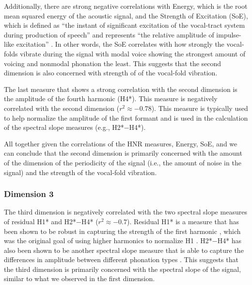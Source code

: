 Additionally, there are strong negative correlations with Energy, which is the root mean squared energy of the acoustic signal, and the Strength of Excitation (SoE), which is defined as ``the instant of significant excitation of the vocal-tract system during production of speech'' and represents ``the relative amplitude of impulse-like excitation'' \citep[1934]{mittalStudyEffectsVocal2014}. In other words, the SoE correlates with how strongly the vocal-folds vibrate during the signal with modal voice showing the strongest amount of voicing and nonmodal phonation the least. This suggests that the second dimension is also concerned with strength of of the vocal-fold vibration.

The last measure that shows a strong correlation with the second dimension is the amplitude of the fourth harmonic (H4*). This measure is negatively correlated with the second dimension ($r^{2} \approx -0.78$). This measure is typically used to help normalize the amplitude of the first formant and is used in the calculation of the spectral slope measures (e.g., H2*$-$H4*).

All together given the correlations of the HNR measures, Energy, SoE, and we can conclude that the second dimension is primarily concerned with the amount of the dimension of the periodicity of the signal (i.e., the amount of noise in the signal) and the strength of the vocal-fold vibration.

\subsubsection{Dimension 3} \label{sec:acousticlandscape:dim3}
The third dimension is negatively correlated with the two spectral slope measures of residual H1* and H2*$-$H4* ($r^{2} \approx -0.7$). Residual H1* is a measure that has been shown to be robust in capturing the strength of the first harmonic \citep{chaiH1H2AcousticMeasure2022,brinkerhoffUsingResidualH12025}, which was the original goal of using higher harmonics to normalize H1 \citep{fischer-jorgensenPhoneticAnalysisBreathy1968}. H2*$-$H4* has also been shown to be another spectral slope measure that is able to capture the differences in amplitude between different phonation types \citep{garellekPhoneticsVoice2019,garellekModelingVoiceSource2016,kreimanUnifiedTheoryVoice2014,kreimanValidatingPsychoacousticModel2021}. This suggests that the third dimension is primarily concerned with the spectral slope of the signal, similar to what we observed in the first dimension.

